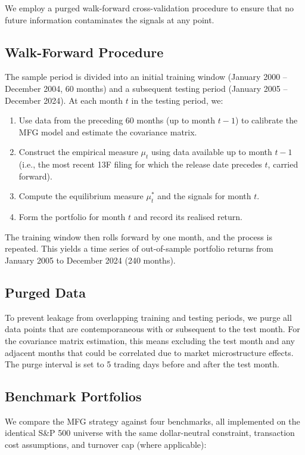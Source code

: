We employ a purged walk-forward cross-validation procedure to ensure that no
future information contaminates the signals at any point.

\subsection{Walk-Forward Procedure}

The sample period is divided into an initial training window (January 2000 --
December 2004, 60 months) and a subsequent testing period (January 2005 --
December 2024). At each month $t$ in the testing period, we:
\begin{enumerate}
    \item Use data from the preceding 60 months (up to month $t-1$) to calibrate
    the MFG model and estimate the covariance matrix.
    \item Construct the empirical measure $\mu_t$ using data available up to
    month $t-1$ (i.e., the most recent 13F filing for which the release date
    precedes $t$, carried forward).
    \item Compute the equilibrium measure $\mu_t^*$ and the signals for month $t$.
    \item Form the portfolio for month $t$ and record its realised return.
\end{enumerate}
The training window then rolls forward by one month, and the process is repeated.
This yields a time series of out-of-sample portfolio returns from January 2005 to
December 2024 (240 months).

\subsection{Purged Data}

To prevent leakage from overlapping training and testing periods, we purge all
data points that are contemporaneous with or subsequent to the test month. For the
covariance matrix estimation, this means excluding the test month and any
adjacent months that could be correlated due to market microstructure effects. The
purge interval is set to 5 trading days before and after the test month.

\subsection{Benchmark Portfolios}

We compare the MFG strategy against four benchmarks, all implemented on the
identical S\&P 500 universe with the same dollar-neutral constraint, transaction
cost assumptions, and turnover cap (where applicable):

